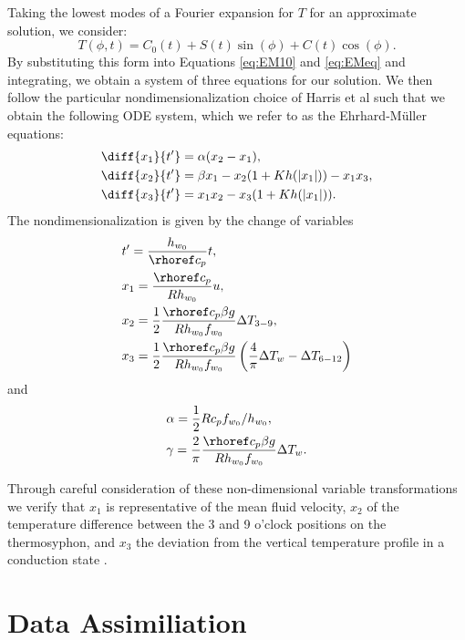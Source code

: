 Taking the lowest modes of a Fourier expansion for $T$ for an approximate solution, we consider:
\begin{equation} T(\phi , t) = C_0 (t) + S(t) \sin (\phi ) + C(t) \cos (\phi) . \end{equation}
By substituting this form into Equations \ref{eq:EM10} and \ref{eq:EMeq} and integrating, we obtain a system of three equations for our solution.
We then follow the particular nondimensionalization choice of Harris et al such that we obtain the following ODE system, which we refer to as the Ehrhard-M\"{u}ller equations:
\begin{align}
& \diff{x_1}{t'} = \alpha (x_2 - x_1),\\
& \diff{x_2}{t'} = \beta x_1 - x_2 (1 + Kh(|x_1|)) - x_1x_3,\\
& \diff{x_3}{t'} = x_1x_2 - x_3 (1 + Kh(|x_1|)) .\end{align}
The nondimensionalization is given by the change of variables
\begin{align}
& t' = \frac{h_{w_0}}{\rhoref c_p}t,\\
& x_1 = \frac{\rhoref c_p }{R h_{w_0}} u, \\
& x_2 = \frac{1}{2} \frac{\rhoref c_p \beta g}{ R h_{w_0} f_{w_0}} \Delta T_{3-9}, \\
& x_3 = \frac{1}{2} \frac{\rhoref c_p \beta g}{ R h_{w_0} f_{w_0}} \left ( \frac{4}{\pi} \Delta T_w - \Delta T_{6-12} \right ) 
\end{align}
and
\begin{align}
& \alpha = \frac{1}{2} R c_p f_{w_0} / h_{w_0} ,\\
& \gamma = \frac{2}{\pi} \frac{\rhoref c_p \beta g}{Rh_{w_0} f_{w_0}} \Delta T_w. \end{align}

Through careful consideration of these non-dimensional variable transformations we verify that $x_1$ is representative of the mean fluid velocity, $x_2$ of the temperature difference between the 3 and 9 o'clock positions on the thermosyphon, and $x_3$ the deviation from the vertical temperature profile in a conduction state \cite{harris2011predicting}.

\clearpage
\pagebreak
\section{Data Assimiliation}

